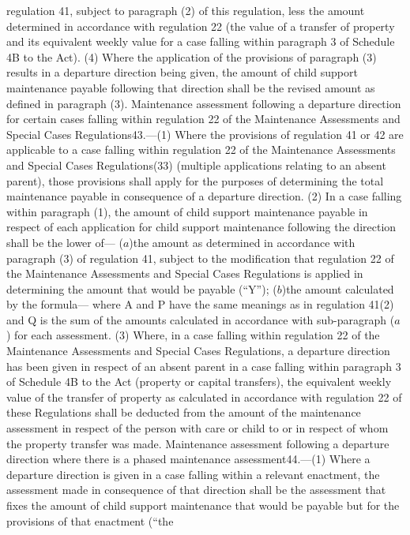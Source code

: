 \documentclass[a4paper]{article}
\begin{document}
regulation 41, subject to paragraph (2) of this regulation, less the amount
determined in accordance with regulation 22 (the value of a transfer of property
and its equivalent weekly value for a case falling within paragraph 3 of
Schedule 4B to the Act).
(4) Where the application of the provisions of paragraph (3) results in a
departure direction being given, the amount of child support maintenance payable
following that direction shall be the revised amount as defined in paragraph
(3).
Maintenance assessment following a departure direction for certain cases falling
within regulation 22 of the Maintenance Assessments and Special Cases
Regulations43.—(1) Where the provisions of regulation 41 or 42 are applicable to
a case falling within regulation 22 of the Maintenance Assessments and Special
Cases Regulations(33) (multiple applications relating to an absent parent),
those provisions shall apply for the purposes of determining the total
maintenance payable in consequence of a departure direction.
(2) In a case falling within paragraph (1), the amount of child support
maintenance payable in respect of each application for child support maintenance
following the direction shall be the lower of—
($a$)the amount as determined in accordance with paragraph (3) of regulation 41,
subject to the modification that regulation 22 of the Maintenance Assessments
and Special Cases Regulations is applied in determining the amount that would be
payable (“Y”);
($b$)the amount calculated by the formula—
where A and P have the same meanings as in regulation 41(2) and Q is the sum of
the amounts calculated in accordance with sub-paragraph ($a$) for each assessment.
(3) Where, in a case falling within regulation 22 of the Maintenance Assessments
and Special Cases Regulations, a departure direction has been given in respect
of an absent parent in a case falling within paragraph 3 of Schedule 4B to the
Act (property or capital transfers), the equivalent weekly value of the transfer
of property as calculated in accordance with regulation 22 of these Regulations
shall be deducted from the amount of the maintenance assessment in respect of
the person with care or child to or in respect of whom the property transfer was
made.
Maintenance assessment following a departure direction where there is a phased
maintenance assessment44.—(1) Where a departure direction is given in a case
falling within a relevant enactment, the assessment made in consequence of that
direction shall be the assessment that fixes the amount of child support
maintenance that would be payable but for the provisions of that enactment (“the
\end{document}
